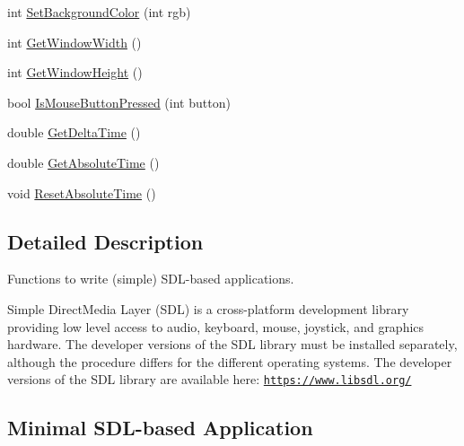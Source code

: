 \begin{DoxyCompactItemize}
\item 
int \hyperlink{group__sdl__group_gaa80de83a7c03984305662ae0ca5daa05}{Set\+Background\+Color} (int rgb)
\item 
int \hyperlink{group__sdl__group_gaa938d3f784d26ccd4ed8c2d83bbc6ab4}{Get\+Window\+Width} ()
\item 
int \hyperlink{group__sdl__group_gac27ddd893a70056c55278b33d7bd2c62}{Get\+Window\+Height} ()
\item 
bool \hyperlink{group__sdl__group_ga2537bad9d6f115fee49a741e7e2623a6}{Is\+Mouse\+Button\+Pressed} (int button)
\item 
double \hyperlink{group__sdl__group_gaf9e3349b29171ad58521f5a7a6238fca}{Get\+Delta\+Time} ()
\item 
double \hyperlink{group__sdl__group_ga9b9387d774c6bc63e5e3c6c91296dedb}{Get\+Absolute\+Time} ()
\item 
void \hyperlink{group__sdl__group_ga5b39467f3664fad21ce3c0f14c4506ff}{Reset\+Absolute\+Time} ()
\end{DoxyCompactItemize}


\subsection{Detailed Description}
Functions to write (simple) S\+D\+L-\/based applications. 

Simple Direct\+Media Layer (S\+DL) is a cross-\/platform development library providing low level access to audio, keyboard, mouse, joystick, and graphics hardware. The developer versions of the S\+DL library must be installed separately, although the procedure differs for the different operating systems. The developer versions of the S\+DL library are available here\+: \href{https://www.libsdl.org/}{\tt https\+://www.\+libsdl.\+org/}\hypertarget{group__sdl__group_sdl_example_sect}{}\subsection{Minimal S\+D\+L-\/based Application}\label{group__sdl__group_sdl_example_sect}

